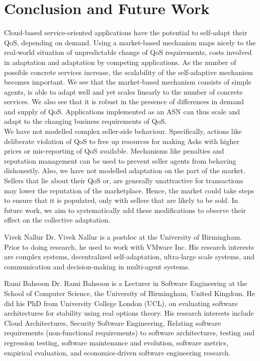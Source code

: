 \documentclass[10pt,journal,compsoc]{IEEEtran}
\begin{document}
\section{Conclusion and Future Work}
Cloud-based service-oriented applications have the potential to self-adapt their QoS, depending on demand. Using a market-based mechanism maps nicely to the real-world situation of unpredictable change of QoS requirements, costs involved in adaptation and adaptation by competing applications. As the number of possible concrete services increase, the scalability of the self-adaptive mechanism becomes important. We see that the market-based mechanism consists of simple agents, is able to adapt well and yet scales linearly to the number of concrete services. We also see that it is robust in the presence of differences in demand and supply of QoS. Applications implemented as an ASN can thus scale and adapt to the changing business requirements of QoS.\\
We have not modelled complex seller-side behaviour. Specifically, actions like deliberate violation of QoS to free up resources for making Asks with higher prices or mis-reporting of QoS available. Mechanisms like penalties and reputation management can be used to prevent seller agents from behaving dishonestly. Also, we have not modelled adaptation on the part of the market. Sellers that lie about their QoS or, are generally unattractive for transactions may lower the reputation of the marketplace. Hence, the market could take steps to ensure that it is populated, only with sellers that are likely to be sold. In future work, we aim to systematically add these modifications to observe their effect on the collective adaptation. \\
  





\begin{IEEEbiographynophoto}{Vivek Nallur}
Dr. Vivek Nallur is a postdoc at the University of Birmingham. Prior to doing research, he used to work with VMware Inc. His research interests are complex systems, decentralized self-adaptation, ultra-large scale systems, and communication and decision-making in multi-agent systems.
\end{IEEEbiographynophoto}

\begin{IEEEbiographynophoto}{Rami Bahsoon}
Dr. Rami Bahsoon is a Lecturer in Software Engineering at the School of Computer Science, the University of Birmingham, United Kingdom. He did his PhD from University College London (UCL), on evaluating software architectures for stability using real options theory. His research interests include Cloud Architectures, Security Software Engineering, Relating software requirements (non-functional requirements) to software architectures, testing and regression testing, software maintenance and evolution, software metrics, empirical evaluation, and economics-driven software engineering research.  
\end{IEEEbiographynophoto}
\end{document}
